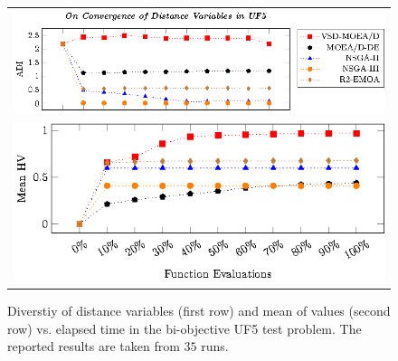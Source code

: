 \begin{figure}[t]
\centering
\begin{tabular}{l}
 \includegraphics[scale=0.8]{images/Diversity_Long_Term_tikz_UF5-figure0.eps}\\[0cm]%
 \includegraphics[scale=0.8]{images/Diversity_Long_Term_tikz_UF5-figure1.eps}\\[0cm]%
\end{tabular}
\caption{Diverstiy of distance variables (first row) and mean of \HV{} values (second row) vs. elapsed time in the bi-objective UF5 test problem. The reported results are taken from $35$ runs.}\label{fig:UF5_Diversity}
\end{figure}

